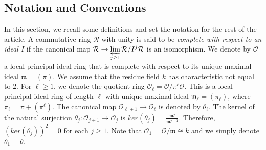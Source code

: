 \documentclass[10pt,twoside]{amsart}
\theoremstyle{definition}
\theoremstyle{definition}
\begin{document}
\subsection{Notation and Conventions}
In this section, we recall some definitions and set the notation for the rest of the article.
A commutative ring $\mathcal{R}$ with unity is said to be \emph{complete with respect to an ideal $I$} if the canonical map $\mathcal{R} \rightarrow \varprojlim\limits_{j\geq 1} \mathcal{R}/I^j\mathcal{R}$ is an isomorphism.
We denote by $\mathcal{O}$ a local principal ideal ring that is complete with respect to its unique maximal ideal $\mathfrak{m} = (\pi)$. We assume that the residue field $k$ has characteristic not equal to $2$. For $\ell\geq 1$, we denote the quotient ring $\mathcal{O}_{\ell} = \mathcal{O}/\pi^{\ell}\mathcal{O}$. This is a local principal ideal ring of length $\ell$ with unique maximal ideal $\mathfrak{m}_\ell = (\pi_\ell)$, where $\pi_\ell = \pi + (\pi^\ell)$. The canonical map $\mathcal{O}_{\ell + 1} \rightarrow \mathcal{O}_{\ell}$ is denoted by $\theta_\ell$. The kernel of the natural surjection $\theta_j\colon \mathcal{O}_{j+1} \rightarrow \mathcal{O}_j$ is $ker(\theta_j) = \frac{\mathfrak{m}^j}{\mathfrak{m}^{j+1}}$. Therefore, $(ker(\theta_j))^2=0$ for each $j\geq 1$. Note that $\mathcal{O}_1 = \mathcal{O}/\mathfrak{m} \cong k$ and we simply denote $\theta_1 = \theta$.
\end{document}
